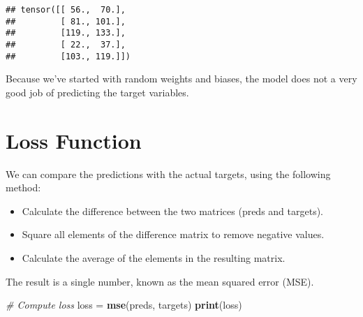 \documentclass[]{book}
\newenvironment{Shaded}{\begin{snugshade}}{\end{snugshade}}
\newcommand{\CommentTok}[1]{\textcolor[rgb]{0.56,0.35,0.01}{\textit{#1}}}
\newcommand{\ControlFlowTok}[1]{\textcolor[rgb]{0.13,0.29,0.53}{\textbf{#1}}}
\newcommand{\KeywordTok}[1]{\textcolor[rgb]{0.13,0.29,0.53}{\textbf{#1}}}
\newcommand{\NormalTok}[1]{#1}
\newcommand{\OperatorTok}[1]{\textcolor[rgb]{0.81,0.36,0.00}{\textbf{#1}}}
\newcommand{\StringTok}[1]{\textcolor[rgb]{0.31,0.60,0.02}{#1}}
\providecommand{\tightlist}{%
  \setlength{\itemsep}{0pt}\setlength{\parskip}{0pt}}
\begin{document}
\begin{verbatim}
## tensor([[ 56.,  70.],
##         [ 81., 101.],
##         [119., 133.],
##         [ 22.,  37.],
##         [103., 119.]])
\end{verbatim}

Because we've started with random weights and biases, the model does not a very good job of predicting the target variables.

\hypertarget{loss-function}{%
\section{Loss Function}\label{loss-function}}

We can compare the predictions with the actual targets, using the following method:

\begin{itemize}
\tightlist
\item
  Calculate the difference between the two matrices (preds and targets).
\item
  Square all elements of the difference matrix to remove negative values.
\item
  Calculate the average of the elements in the resulting matrix.
\end{itemize}

The result is a single number, known as the mean squared error (MSE).

\begin{Shaded}
\end{Shaded}

\begin{Shaded}
\begin{Highlighting}[]
\CommentTok{# Compute loss}
\NormalTok{loss =}\StringTok{ }\KeywordTok{mse}\NormalTok{(preds, targets)}
\KeywordTok{print}\NormalTok{(loss)}
\end{Highlighting}
\end{Shaded}
\end{document}
